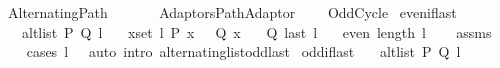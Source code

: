 %
\begin{isabellebody}%
%
%
\isadelimtheory
%
\endisadelimtheory
%
\isatagtheory
{}\isamarkupfalse%
\ Alternating{\isacharunderscore}{\kern0pt}Path\isanewline
\ \ \isanewline
\ \ \ \ {\isachardoublequoteopen}{\isachardot}{\kern0pt}{\isachardot}{\kern0pt}{\isacharslash}{\kern0pt}Adaptors{\isacharslash}{\kern0pt}Path{\isacharunderscore}{\kern0pt}Adaptor{\isachardoublequoteclose}\isanewline
\ \ \ \ Odd{\isacharunderscore}{\kern0pt}Cycle\isanewline
{}%
\endisatagtheory
{\isafoldtheory}%
%
\isadelimtheory
\isanewline
%
\endisadelimtheory
%
\isadeliminvisible
\isanewline
%
\endisadeliminvisible
%
\isataginvisible
{}\isamarkupfalse%
\ even{\isacharunderscore}{\kern0pt}if{\isacharunderscore}{\kern0pt}last{\isacharcolon}{\kern0pt}\isanewline
\ \ \ {\isachardoublequoteopen}alt{\isacharunderscore}{\kern0pt}list\ P\ Q\ l{\isachardoublequoteclose}\isanewline
\ \ \ {\isachardoublequoteopen}{\isasymforall}x{\isasymin}set\ l{\isachardot}{\kern0pt}\ P\ x\ {\isasymlongleftrightarrow}\ {\isasymnot}\ Q\ x{\isachardoublequoteclose}\isanewline
\ \ \ {\isachardoublequoteopen}Q\ {\isacharparenleft}{\kern0pt}last\ l{\isacharparenright}{\kern0pt}{\isachardoublequoteclose}\isanewline
\ \ \ {\isachardoublequoteopen}even\ {\isacharparenleft}{\kern0pt}length\ l{\isacharparenright}{\kern0pt}{\isachardoublequoteclose}%
\endisataginvisible
{\isafoldinvisible}%
%
\isadeliminvisible
\isanewline
%
\endisadeliminvisible
%
\isadelimproof
\ \ %
\endisadelimproof
%
\isatagproof
{}\isamarkupfalse%
\ assms\isanewline
\ \ \isamarkupfalse%
\ {\isacharparenleft}{\kern0pt}cases\ {\isachardoublequoteopen}l\ {\isacharequal}{\kern0pt}\ {\isacharbrackleft}{\kern0pt}{\isacharbrackright}{\kern0pt}{\isachardoublequoteclose}{\isacharparenright}{\kern0pt}\ {\isacharparenleft}{\kern0pt}auto\ intro{\isacharcolon}{\kern0pt}\ alternating{\isacharunderscore}{\kern0pt}list{\isacharunderscore}{\kern0pt}odd{\isacharunderscore}{\kern0pt}last{\isacharparenright}{\kern0pt}%
\endisatagproof
{\isafoldproof}%
%
\isadelimproof
\isanewline
%
\endisadelimproof
%
\isadeliminvisible
\isanewline
%
\endisadeliminvisible
%
\isataginvisible
{}\isamarkupfalse%
\ odd{\isacharunderscore}{\kern0pt}if{\isacharunderscore}{\kern0pt}last{\isacharcolon}{\kern0pt}\isanewline
\ \ \ {\isachardoublequoteopen}alt{\isacharunderscore}{\kern0pt}list\ P\ Q\ l{\isachardoublequoteclose}\isanewline

\end{isabellebody}
